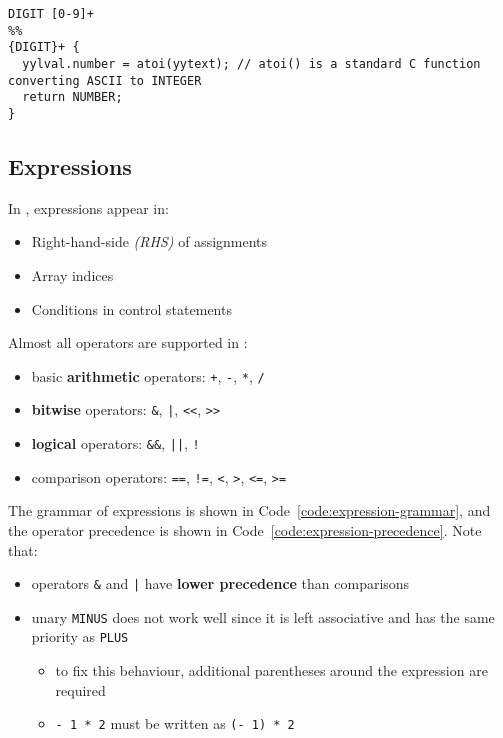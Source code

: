 \begin{onepage}
  \begin{lstlisting}[language=LANCE, caption={Content of \texttt{Acse.lex} file}, label={code:variable-constant-integers-Acse-lex}]
DIGIT [0-9]+
%%
{DIGIT}+ {
  yylval.number = atoi(yytext); // atoi() is a standard C function converting ASCII to INTEGER
  return NUMBER;
}
\end{lstlisting}
\end{onepage}

\subsection{Expressions}

In \lance, expressions appear in:

\begin{itemize}
  \item Right-hand-side \textit{(RHS)} of assignments
  \item Array indices
  \item Conditions in control statements
\end{itemize}

Almost all \clang operators are supported in \lance:

\begin{itemize}
  \item basic \textbf{arithmetic} operators: \texttt{+}, \texttt{-}, \texttt{*}, \texttt{/}
  \item \textbf{bitwise} operators: \texttt{\&}, \texttt{|}, \texttt{<<}, \texttt{>>}
  \item \textbf{logical} operators: \texttt{\&\&}, \texttt{||}, \texttt{!}
  \item comparison operators: \texttt{==}, \texttt{!=}, \texttt{<}, \texttt{>}, \texttt{<=}, \texttt{>=}
\end{itemize}

The grammar of expressions is shown in Code~\ref{code:expression-grammar}, and the operator precedence is shown in Code~\ref{code:expression-precedence}.
Note that:

\begin{itemize}
  \item operators \texttt{\&} and \texttt{|} have \textbf{lower precedence} than comparisons
  \item unary \texttt{MINUS} does not work well since it is left associative and has the same priority as \texttt{PLUS}
        \begin{itemize}
          \item to fix this behaviour, additional parentheses around the expression are required
          \item \texttt{- 1 * 2} must be written as \texttt{(- 1) * 2}
        \end{itemize}
\end{itemize}

